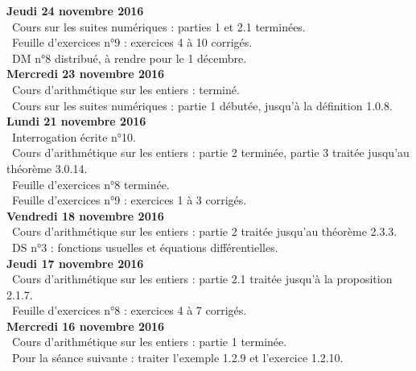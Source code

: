 \documentclass[12pt,a4paper]{article}
\begin{document}
\noindent\textbf{Jeudi 24 novembre 2016}\\
\bu\ Cours sur les suites numériques : parties 1 et 2.1 terminées.\\
\bu\ Feuille d'exercices n°9 : exercices 4 à 10 corrigés. \\
\bu\ DM n°8 distribué, à rendre pour le 1 décembre.\vspace{.4cm}\\

\noindent\textbf{Mercredi 23 novembre 2016}\\
\bu\ Cours d'arithmétique sur les entiers : terminé. \\
\bu\ Cours sur les suites numériques : partie 1 débutée, jusqu'à la définition 1.0.8.\vspace{.4cm}\\

\noindent\textbf{Lundi 21 novembre 2016}\\
\bu\ Interrogation écrite n°10.\\
\bu\ Cours d'arithmétique sur les entiers : partie 2 terminée, partie 3 traitée jusqu'au théorème 3.0.14. \\
\bu\ Feuille d'exercices n°8 terminée. \\
\bu\ Feuille d'exercices n°9 : exercices 1 à 3 corrigés.\vspace{.4cm}\\

\noindent\textbf{Vendredi 18 novembre 2016}\\
\bu\ Cours d'arithmétique sur les entiers : partie 2 traitée jusqu'au théorème 2.3.3. \\
\bu\ DS n°3 : fonctions  usuelles et équations différentielles.\vspace{.4cm}\\

\noindent\textbf{Jeudi 17 novembre 2016}\\
\bu\ Cours d'arithmétique sur les entiers : partie 2.1 traitée jusqu'à la proposition 2.1.7. \\
\bu\ Feuille d'exercices n°8 : exercices 4 à 7 corrigés.\vspace{.4cm}\\

\noindent\textbf{Mercredi 16 novembre 2016}\\
\bu\ Cours d'arithmétique sur les entiers : partie 1 terminée. \\
\bu\ Pour la séance suivante : traiter l'exemple 1.2.9 et l'exercice 1.2.10.\vspace{.4cm}\\
\end{document}
